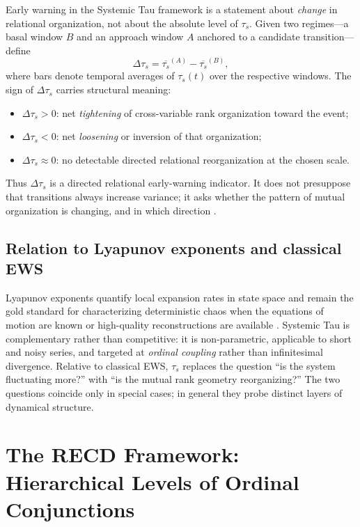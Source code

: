 \documentclass[11pt,a4paper]{article}
\begin{document}
Early warning in the Systemic Tau framework is a statement about
\emph{change} in relational organization, not about the absolute level of
$\tau_s$. Given two regimes---a basal window $B$ and an approach window
$A$ anchored to a candidate transition---define
\begin{equation}
\label{eq:delta_tau}
\Delta\tau_s
=\overline{\tau_s}^{(A)}-\overline{\tau_s}^{(B)},
\end{equation}
where bars denote temporal averages of $\tau_s(t)$ over the respective
windows. The sign of $\Delta\tau_s$ carries structural meaning:
\begin{itemize}[leftmargin=*,itemsep=2pt]
  \item $\Delta\tau_s>0$: net \emph{tightening} of cross-variable rank
  organization toward the event;
  \item $\Delta\tau_s<0$: net \emph{loosening} or inversion of that
  organization;
  \item $\Delta\tau_s\approx 0$: no detectable directed relational
  reorganization at the chosen scale.
\end{itemize}
Thus $\Delta\tau_s$ is a directed relational early-warning indicator. It
does not presuppose that transitions always increase variance; it asks
whether the pattern of mutual organization is changing, and in which
direction \cite{Padilla2025preprints,Padilla2026software}.

\subsection{Relation to Lyapunov exponents and classical EWS}

Lyapunov exponents quantify local expansion rates in state space and
remain the gold standard for characterizing deterministic chaos when the
equations of motion are known or high-quality reconstructions are
available \cite{Wolf1985}. Systemic Tau is complementary rather than
competitive: it is non-parametric, applicable to short and noisy series,
and targeted at \emph{ordinal coupling} rather than infinitesimal
divergence. Relative to classical EWS, $\tau_s$ replaces the question
``is the system fluctuating more?'' with ``is the mutual rank geometry
reorganizing?'' The two questions coincide only in special cases; in
general they probe distinct layers of dynamical structure.

\section{The RECD Framework: Hierarchical Levels of Ordinal Conjunctions}
\label{sec:recd}
\end{document}
